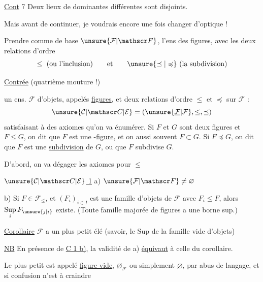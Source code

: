 \uline{Cont} 7 Deux lieux de  dominantes différentes sont disjoints.

Mais avant de continuer, je voudrais encore une fois changer d'optique !

Prendre comme  de base $\unsure{\mathcal F|\mathscr F}$, l'ens des figures, avec les deux relations d'ordre \[ \leq\ \text{(ou l'inclusion)} \qquad \text{et}\qquad \unsure{\preceq|\preccurlyeq}\ \text{(la subdivision)} \]

\uline{Contrée} (quatrième mouture !)

 un ens. $\mathcal F$ d'objets, appelés \uline{figures}, et deux relations d'ordre $\leq$ et $\preceq$ sur $\mathcal F$ : \[ \unsure{\mathcal C|\mathscr C|\mathcal E}=(\unsure{\underline{\mathcal F}|\mathcal F},\leq,\preceq) \] satisfaisant à des axiomes\unsure{,|{}} qu'on va énumérer. Si $F$ et $G$ sont deux figures et $F\leq G$, on dit que $F$ est une -\uline{figure}, et on  aussi souvent $F\subset G$. Si $F\preceq G$, on dit que $F$ est une \uline{subdivision} de $G$, ou que $F$ subdivise $G$.


D'abord, on va dégager les axiomes pour $\leq$

\uline{$\unsure{\mathcal C|\mathscr C|\mathcal E}$ 1} a) $\unsure{\mathcal F|\mathscr F}\ne\varnothing$

 b) Si $F\in\mathcal F_{\leq}$, et $(F_i)_{i\in I}$ est une famille d'objets de $\mathcal F$ avec $F_i\leq F$, alors $\underset{i}{\mathrm{Sup}}\,F_{\unsure{j|i}}$ existe. (Toute famille majorée de figures a une borne sup.)

\uline{Corollaire} $\mathcal F$ a un plus petit élé (savoir, le $\mathrm{Sup}$ de la famille vide d'objets)

\uline{NB} En présence de  \uline{C 1 b)}, la validité de a) \uline{équivaut} à celle du corollaire.

Le plus petit  est appelé \uline{figure vide},  $\varnothing_{\mathcal F}$ ou simplement $\varnothing$, par abus de langage, et si confusion n'est à craindre



